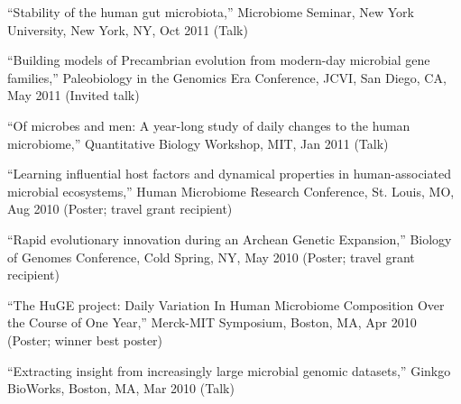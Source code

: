\documentclass[overlapped,line,11pt]{res}
\newenvironment{list2}{
  \begin{list}{$\bullet$}{%
      \setlength{\itemsep}{0in}
      \setlength{\parsep}{0in} \setlength{\parskip}{0in}
      \setlength{\topsep}{0in} \setlength{\partopsep}{0in} 
      \setlength{\leftmargin}{0.2in}}}{\end{list}}
\begin{document}
\begin{resume}
\begin{revnumerate}[32]
\item {``Stability of the human gut microbiota,'' Microbiome Seminar,
  New York University, New York, NY, Oct 2011 (Talk)}
\vspace*{0mm}

\item {``Building models of Precambrian evolution from modern-day
  microbial gene families,'' Paleobiology in the Genomics Era
  Conference, JCVI, San Diego, CA, May 2011 (Invited talk)}
\vspace*{0mm}

\item {``Of microbes and men:
A year-long study of daily changes to the human microbiome,''
Quantitative Biology Workshop, MIT, Jan 2011 (Talk)}
\vspace*{0mm}

\item {``Learning influential host factors and dynamical properties in
human-associated microbial ecosystems,'' Human Microbiome Research
Conference, St. Louis, MO, Aug 2010 (Poster; travel grant recipient)}
\vspace*{0mm}

\item {``Rapid evolutionary innovation during an Archean Genetic
  Expansion,'' Biology of Genomes Conference, Cold Spring, NY,
  May 2010 (Poster; travel grant recipient)}
\vspace*{0mm}


\item {``The HuGE project: Daily Variation In Human Microbiome
Composition Over the Course of One Year,'' Merck-MIT Symposium,
Boston, MA, Apr 2010 (Poster; winner best poster)}
\vspace*{0mm}


\item {``Extracting insight from increasingly large microbial genomic
  datasets,'' Ginkgo BioWorks, Boston, MA, Mar 2010 (Talk)}
\vspace*{0mm}

\end{revnumerate}




\end{resume}
\end{document}
